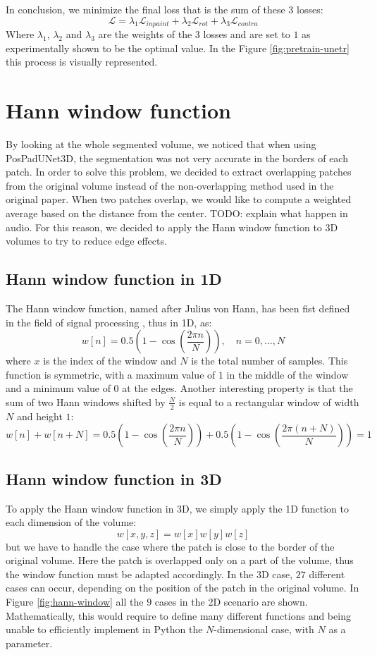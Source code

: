 In conclusion, we minimize the final loss that is the sum of these 3 losses:
$$
\mathcal{L} = \lambda_1\mathcal{L}_{inpaint} + \lambda_2\mathcal{L}_{rot} +
\lambda_3\mathcal{L}_{contra}
$$
Where $\lambda_1$, $\lambda_2$ and $\lambda_3$ are the weights of the 3 losses
and are set to $1$ as experimentally shown to be the optimal value. In the
Figure \ref{fig:pretrain-unetr} this process is visually represented.

\section{Hann window function}
By looking at the whole segmented volume, we noticed that when using
PosPadUNet3D, the segmentation was not very accurate in the borders of each
patch. In order to solve this problem, we decided to extract overlapping patches
from the original volume instead of the non-overlapping method used in the
original paper. When two patches overlap, we would like to compute a weighted
average based on the distance from the center.
TODO: explain what happen in audio.
For this reason, we decided to apply the Hann window function to 3D volumes to
try to reduce edge effects.
\subsection{Hann window function in 1D}
The Hann window function, named after Julius von Hann, has been fist defined in
the field of signal processing \cite{oord2018representation}, thus in 1D, as:
$$
w[n] = 0.5(1 - \cos(\frac{2\pi n}{N})), \quad n = 0, \dots, N
$$
where $x$ is the index of the window and $N$ is the total number of samples.
This function is symmetric, with a maximum value of $1$ in the middle of the
window and a minimum value of $0$ at the edges.
Another interesting property is that the sum of two Hann windows shifted by $\frac{N}{2}$
is equal to a rectangular window of width $N$ and height $1$:
\begin{equation}
  \label{eq:hannisone}
  w[n] + w[n + N] = 0.5(1 - \cos(\frac{2\pi n}{N})) + 0.5(1 - \cos(\frac{2\pi (n + N)}{N} )) = 1
\end{equation}
\subsection{Hann window function in 3D}
To apply the Hann window function in 3D, we simply apply the 1D function to each
dimension of the volume:
\begin{equation}
  w[x, y, z] = w[x]w[y]w[z]
\end{equation}
but we have to handle the case where the patch is close to the border of the
original volume. Here the patch is overlapped only on a part of the volume, thus
the window function must be adapted accordingly. In the 3D case, $27$ different
cases can occur, depending on the position of the patch in the original volume.
In Figure \ref{fig:hann-window} all the $9$ cases in the 2D scenario are shown.
Mathematically, this would require to define many different functions and being
unable to efficiently implement in Python the $N$-dimensional case, with $N$ as
a parameter.

